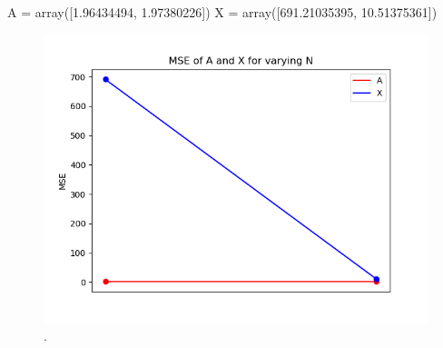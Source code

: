 A = array([1.96434494, 1.97380226])
X = array([691.21035395,  10.51375361])
\begin{figure}[H]
\centering
\includegraphics[scale=0.5]{figures/chapter6/AR_Error_vary_n_m16_L1000.png}
\caption{.}
\label{fig:}
\end{figure}
\noindent